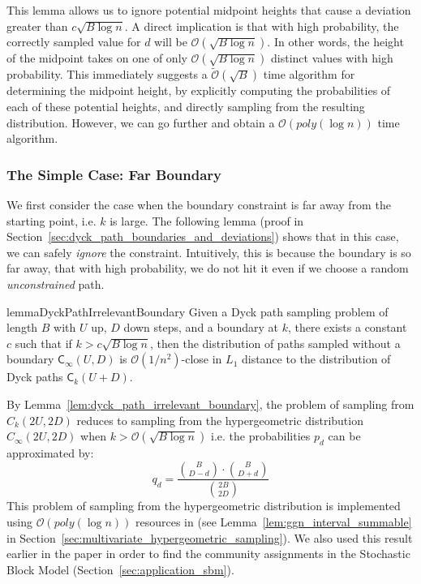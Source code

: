 This lemma allows us to ignore potential midpoint heights that cause a deviation greater than $c \sqrt{B\log n}$.
A direct implication is that with high probability, the correctly sampled value for $d$ will be $\mathcal O(\sqrt{B\log n})$.
In other words, the height of the midpoint takes on one of only  $\mathcal O(\sqrt{B\log n})$ distinct values with high probability.
This immediately suggests a $\widetilde{\mathcal O}(\sqrt{B})$ time algorithm for determining the midpoint height,
by explicitly computing the probabilities of each of these potential heights, and directly sampling from the resulting distribution.
However, we can go further and obtain a $\mathcal O(poly(\log n))$ time algorithm.


\subsubsection{The Simple Case: Far Boundary}%
\label{sec:the_simple_case}
We first consider the case when the boundary constraint is far away from the starting point, i.e. $k$ is large.
The following lemma (proof in Section~\ref{sec:dyck_path_boundaries_and_deviations}) shows that in this case,
we can safely \emph{ignore} the constraint.  Intuitively, this is because the boundary is so far away,
that with high probability, we do not hit it even if we choose a random \emph{unconstrained} path.
\begin{restatable}{lemma}{DyckPathIrrelevantBoundary}
\label{lem:dyck_path_irrelevant_boundary}
Given a Dyck path sampling problem of length $B$ with $U$ up, $D$ down steps, and a boundary at $k$,
there exists a constant $c$ such that if $k > c \sqrt{B\log n}$, then the distribution of paths sampled without a boundary $\mathsf C_{\infty}(U,D)$
is $\mathcal O(1/n^2)$-close in $L_1$ distance to the distribution of Dyck paths $\mathsf C_k(U+D)$.
\end{restatable}
By Lemma~\ref{lem:dyck_path_irrelevant_boundary}, the problem of sampling from $C_k(2U,2D)$
reduces to sampling from the hypergeometric distribution $C_{\infty}(2U,2D)$ when $k>\mathcal{O}(\sqrt{B\log n})$
i.e. the probabilities $p_d$ can be approximated by:
\[
q_d = \frac{{{B}\choose{D-d}}\cdot{{B}\choose{D+d}}}{{{2B}\choose{2D}}}
\]
This problem of sampling from the hypergeometric distribution is implemented using $\mathcal O(poly(\log n))$ resources in \cite{huge}
(see Lemma~\ref{lem:ggn_interval_summable} in Section~\ref{sec:multivariate_hypergeometric_sampling}).
We also used this result earlier in the paper in order to find the community assignments in the Stochastic Block Model
(Section~\ref{sec:application_sbm}).

